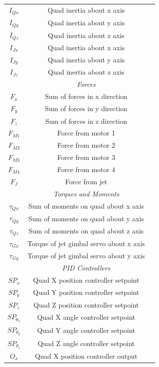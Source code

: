 \documentclass[10pt]{article}
\begin{document}
\begin{center}
\begin{longtable}{|ccc|}
    \hline
    $I_{Qx}$ & Quad inertia about x axis & \\
    $I_{Qy}$ & Quad inertia about y axis & \\
    $I_{Qz}$ & Quad inertia about z axis & \\
    $I_{Jx}$ & Quad inertia about x axis & \\
    $I_{Jy}$ & Quad inertia about y axis & \\
    $I_{Jz}$ & Quad inertia about z axis & \\
    \hline
    & \emph{Forces} & \\
    \hline
    $F_x$ & Sum of forces in x direction & \\
    $F_y$ & Sum of forces in y direction & \\
    $F_z$ & Sum of forces in z direction & \\
    $F_{M1}$ & Force from motor 1 & \\
    $F_{M2}$ & Force from motor 2 & \\
    $F_{M3}$ & Force from motor 3 & \\
    $F_{M4}$ & Force from motor 4 & \\
    $F_J$ & Force from jet & \\
    \hline
    & \emph{Torques and Moments} & \\
    \hline
    $\tau_{Qx}$ & Sum of moments on quad about x axis & \\
    $\tau_{Qy}$ & Sum of moments on quad about y axis & \\
    $\tau_{Qz}$ & Sum of moments on quad about z axis & \\
    $\tau_{Gx}$ & Torque of jet gimbal servo about x axis & \\
    $\tau_{Gy}$ & Torque of jet gimbal servo about y axis & \\
    \hline
    & \emph{PID Controllers} & \\
    \hline
    $SP_x$ & Quad X position controller setpoint & \\
    $SP_y$ & Quad Y position controller setpoint & \\
    $SP_z$ & Quad Z position controller setpoint & \\
    $SP_{\theta_x}$ & Quad X angle controller setpoint & \\
    $SP_{\theta_y}$ & Quad Y angle controller setpoint & \\
    $SP_{\theta_z}$ & Quad Z angle controller setpoint & \\
    $O_x$ & Quad X position controller output & \\

\end{longtable}
\end{center}
\end{document}
